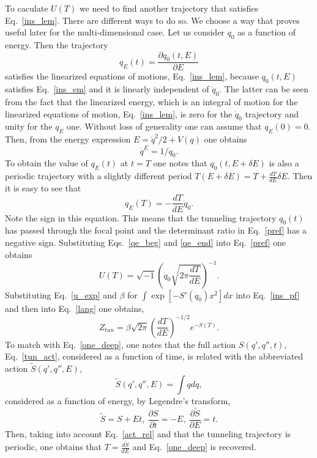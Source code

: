 \documentclass[journal=jpcafh,manuscript=article]{achemso}
\begin{document}
To caculate $U(T)$ we need to find another trajectory that
satisfies Eq.~\ref{ins_lem}. There are different ways to do so.
We choose a way that proves useful later for the multi-dimensional case.
Let us consider $q_0$ as a function of energy. Then the trajectory
\begin{equation}
  \label{en_traj}
  q_E(t)=\frac{\partial q_0(t, E)}{\partial E}
\end{equation}
satisfies the linearized equations of motions, Eq.~\ref{ins_lem},
because $q_0(t, E)$ satisfies Eq.~\ref{ins_em} and it is linearly
independent of $\dot{q}_0$. The latter can be seen from the fact that
the linearized energy, which is an integral of motion for the
linearized equations of motion, Eq.~\ref{ins_lem}, is zero for the
$\dot{q}_0$ trajectory and unity for the $q_E$ one.  Without loss of
generality one can assume that $q_E(0) = 0$. Then, from the energy
expression $E = \dot{q}^2/2 + V(q)$ one obtains
\begin{equation}
  \label{qe_beg}
  \dot{q}^E= 1/\dot{q}_0.
\end{equation}
To obtain the value of $q_E(t)$ at $t=T$ one notes that
$q_0(t, E + \delta E)$ is also a periodic trajectory with a slightly
different period $T(E + \delta E) = T + \frac{dT}{dE}\delta E$.  Then
it is easy to see that
\begin{equation}
  \label{qe_end}
  q_E(T) = - \frac{dT}{dE}\dot{q}_0. 
\end{equation}
Note the sign in this equation. This means that the tunneling trajectory $q_0(t)$
has passed through the focal point and the determinant ratio in
Eq.~\ref{pref} has a negative sign. Substituting Eqs.~\ref{qe_beg} and
\ref{qe_end} into Eq.~\ref{pref} one obtains
\begin{equation}
  \label{u_exp}
  U(T) = \sqrt{-1}\left(\dot{q}_0\sqrt{2\pi\frac{dT}{dE}}\right)^{-1}.
\end{equation}
Substituting Eq.~\ref{u_exp} and $\beta$ for
$\int\exp[-S'(\dot{q}_0)x^2]dx$ into Eq.~\ref{ins_pf} and then into
Eq.~\ref{lang} one obtains,
\begin{equation}
  \label{one_ins}
  Z_{tun}=\beta \sqrt{2\pi}\left(\frac{dT}{dE}\right)^{-1/2}e^{-S(T)}.
\end{equation}
To match with Eq.~\ref{one_deep}, one notes that the full action $S(q',
q'', t)$,
Eq.~\ref{tun_act}, considered as a function of time, is related with
the abbreviated action $\tilde{S}(q', q'', E)$,
\begin{equation}
  \label{short_act}
  \tilde{S}(q', q'', E) = \int \dot{q}dq,
\end{equation}
considered as a function of energy, by Legendre's transform,
\begin{equation}
  \label{act_leg}
  \tilde{S} = S + Et,\ \frac{\partial S}{\partial t} = -E,\ \frac{\partial\tilde{S}}{\partial E} = t.
\end{equation}
Then, taking into account Eq.~\ref{act_rel} and that the tunneling
trajectory is periodic, one obtains that $T=\frac{d\tilde{S}}{dE}$ and
Eq.~\ref{one_deep} is recovered.
\end{document}
